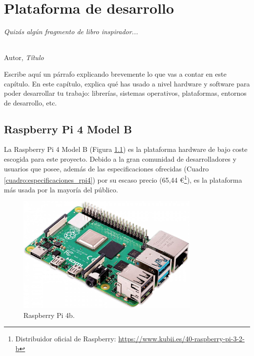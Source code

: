 \chapter{Plataforma de desarrollo}
\label{cap:capitulo3}

\begin{flushright}
\begin{minipage}[]{10cm}
\emph{Quizás algún fragmento de libro inspirador...}\\
\end{minipage}\\

Autor, \textit{Título}\\
\end{flushright}

\vspace{1cm}

Escribe aquí un párrafo explicando brevemente lo que vas a contar en este capítulo. En este capítulo, explica qué has usado a nivel hardware y software para poder desarrollar tu trabajo: librerías, sistemas operativos, plataformas, entornos de desarrollo, etc.

\section{Raspberry Pi 4 Model B}
\label{sec:rpi}

La Raspberry Pi 4 Model B (Figura \ref{fig:raspberry2}) es la plataforma hardware de bajo coste escogida para este proyecto. Debido a la gran comunidad de desarrolladores y usuarios que posee, además de las especificaciones ofrecidas (Cuadro \ref{cuadro:especificaciones_rpi4}) por su escaso precio (65,44 \euro\footnote{Distribuidor oficial de Raspberry: \url{https://www.kubii.es/40-raspberry-pi-3-2-b}}), es la plataforma más usada por la mayoría del público.\\

\begin{figure} [h!]
  \begin{center}
    \includegraphics[width=9cm]{figs/raspberry.jpg}
  \end{center}
  \caption{Raspberry Pi 4b.}
  \label{fig:raspberry2}
\end{figure}

